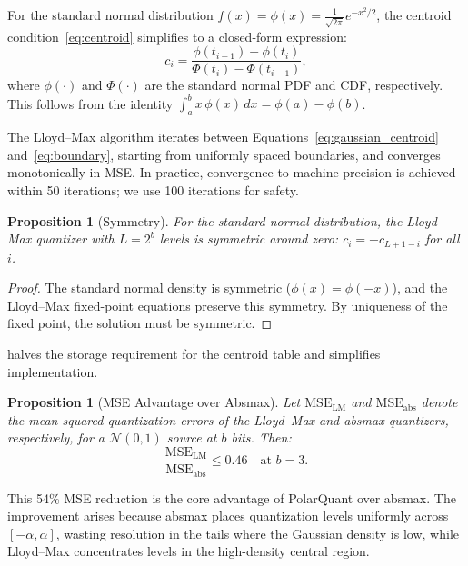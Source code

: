 \documentclass[10pt,twocolumn]{article}
\newtheorem{proposition}[theorem]{Proposition}
\begin{document}
For the standard normal distribution $f(x) = \phi(x) = \frac{1}{\sqrt{2\pi}} e^{-x^2/2}$, the centroid condition~\eqref{eq:centroid} simplifies to a closed-form expression:
\begin{equation}
  c_i = \frac{\phi(t_{i-1}) - \phi(t_i)}{\Phi(t_i) - \Phi(t_{i-1})},
  \label{eq:gaussian_centroid}
\end{equation}
where $\phi(\cdot)$ and $\Phi(\cdot)$ are the standard normal PDF and CDF, respectively. This follows from the identity $\int_a^b x \, \phi(x) \, dx = \phi(a) - \phi(b)$.

The Lloyd--Max algorithm iterates between Equations~\eqref{eq:gaussian_centroid} and~\eqref{eq:boundary}, starting from uniformly spaced boundaries, and converges monotonically in MSE. In practice, convergence to machine precision is achieved within 50 iterations; we use 100 iterations for safety.

\begin{proposition}[Symmetry]
\label{prop:symmetry}
For the standard normal distribution, the Lloyd--Max quantizer with $L = 2^b$ levels is symmetric around zero: $c_i = -c_{L+1-i}$ for all $i$.
\end{proposition}
\begin{proof}
The standard normal density is symmetric ($\phi(x) = \phi(-x)$), and the Lloyd--Max fixed-point equations preserve this symmetry. By uniqueness of the fixed point, the solution must be symmetric.
\end{proof}

 halves the storage requirement for the centroid table and simplifies implementation.

\begin{proposition}[MSE Advantage over Absmax]
\label{prop:mse}
Let $\mathrm{MSE}_{\mathrm{LM}}$ and $\mathrm{MSE}_{\mathrm{abs}}$ denote the mean squared quantization errors of the Lloyd--Max and absmax quantizers, respectively, for a $\mathcal{N}(0,1)$ source at $b$ bits. Then:
\begin{equation}
  \frac{\mathrm{MSE}_{\mathrm{LM}}}{\mathrm{MSE}_{\mathrm{abs}}} \leq 0.46 \quad \text{at } b = 3.
  \label{eq:mse_ratio}
\end{equation}
\end{proposition}

This 54\% MSE reduction is the core advantage of PolarQuant over absmax. The improvement arises because absmax places quantization levels uniformly across $[-\alpha, \alpha]$, wasting resolution in the tails where the Gaussian density is low, while Lloyd--Max concentrates levels in the high-density central region.
\end{document}
